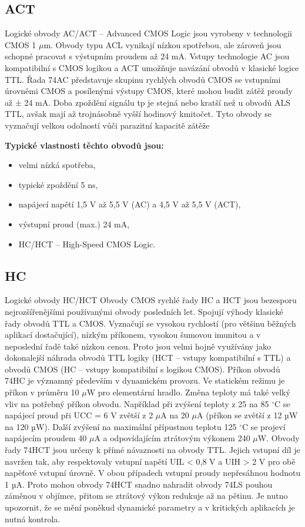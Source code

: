 \subsection{ACT}
Logické obvody AC/ACT – Advanced CMOS Logic jsou vyrobeny v technologii
CMOS 1 $\mu$m. Obvody typu ACL vynikají nízkou spotřebou, ale zároveň jsou schopné
pracovat s výstupním proudem až 24 mA. Vstupy technologie AC jsou kompatibilní
s CMOS logikou a ACT umožňuje navázání obvodů v klasické logice TTL. Řada
74AC představuje skupinu rychlých obvodů CMOS se vstupními úrovněmi CMOS a
posílenými výstupy CMOS, které mohou budit zátěž proudy až ± 24 mA. Doba
zpoždění signálu tp je stejná nebo kratší než u obvodů ALS TTL, avšak mají až
trojnásobně vyšší hodinový kmitočet. Tyto obvody se vyznačují velkou odolností vůči
parazitní kapacitě zátěže

\textbf{Typické vlastnosti těchto obvodů jsou:}\\
\begin{itemize}
\item velmi nízká spotřeba,
\item typické zpoždění 5 ns,
\item napájecí napětí 1,5 V až 5,5 V (AC) a 4,5 V až 5,5 V (ACT),
\item výstupní proud (max.) 24 mA,
\item HC/HCT – High-Speed CMOS Logic.
\end{itemize}

\subsection{HC}
Logické obvody HC/HCT Obvody CMOS rychlé řady HC a HCT jsou bezesporu
nejrozšířenějšími používanými obvody posledních let. Spojují výhody klasické řady
obvodů TTL a CMOS. Vyznačují se vysokou rychlostí (pro většinu běžných aplikací
dostačující), nízkým příkonem, vysokou šumovou imunitou a v neposlední řadě také
nízkou cenou. Proto jsou velmi hojně využívány jako dokonalejší náhrada obvodů
TTL logiky (HCT – vstupy kompatibilní s TTL) a obvodů CMOS (HC – vstupy
kompatibilní s logikou CMOS). Příkon obvodů 74HC je významný především v
dynamickém provozu. Ve statickém režimu je příkon v průměru 10 $\mu$W pro
elementární hradlo. Změna teploty má také velký vliv na potřebný příkon obvodu.
Například při zvýšení teploty z 25 na 85 $^{\circ}$C se napájecí proud při UCC = 6 V zvětší z 2
$\mu$A na 20 $\mu$A (příkon se zvětší z 12 µW na 120 µW). Další zvýšení na maximální
přípustnou teplotu 125 $^{\circ}$C se projeví napájecím proudem 40 $\mu$A a odpovídajícím ztrátovým výkonem 240 $\mu$W. Obvody řady 74HCT jsou určeny k přímé návaznosti na obvody TTL. Jejich vstupní díl je navržen tak, aby respektovaly vstupní napětí UIL < 0,8 V a UIH > 2 V pro obě napěťové vstupní úrovně. V obou případech vstupní proudy nepřesáhnou hodnotu 1 µA. Proto mohou obvody 74HCT snadno nahradit obvody 74LS pouhou záměnou v objímce, přitom se ztrátový výkon redukuje až na pětinu. Je nutno upozornit, že se mění poněkud dynamické parametry a v kritických aplikacích je
nutná kontrola.


